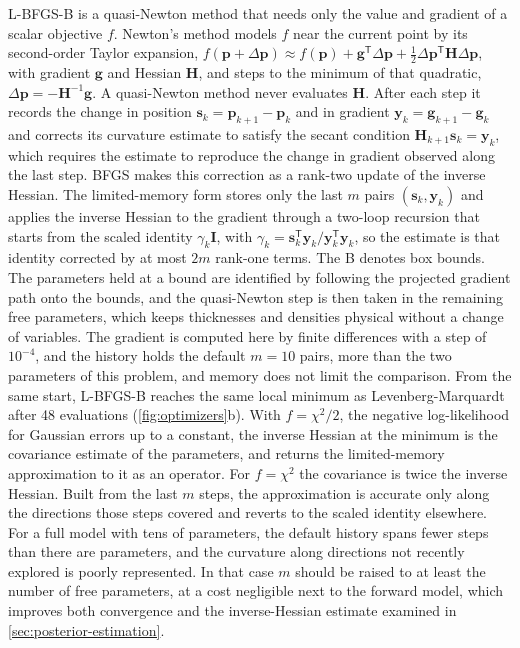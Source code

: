 L-BFGS-B is a quasi-Newton method that needs only the value and gradient of a scalar objective \(f\).\autocite{byrdLimitedMemoryAlgorithm1995} Newton's method models \(f\) near the current point by its second-order Taylor expansion, \(f(\mathbf{p} + \Delta\mathbf{p}) \approx f(\mathbf{p}) + \mathbf{g}^{\mathsf{T}}\Delta\mathbf{p} + \tfrac{1}{2}\Delta\mathbf{p}^{\mathsf{T}}\mathbf{H}\Delta\mathbf{p}\), with gradient \(\mathbf{g}\) and Hessian \(\mathbf{H}\), and steps to the minimum of that quadratic, \(\Delta\mathbf{p} = - \mathbf{H}^{- 1}\mathbf{g}\). A quasi-Newton method never evaluates \(\mathbf{H}\). After each step it records the change in position \(\mathbf{s}_{k} = \mathbf{p}_{k + 1} - \mathbf{p}_{k}\) and in gradient \(\mathbf{y}_{k} = \mathbf{g}_{k + 1} - \mathbf{g}_{k}\) and corrects its curvature estimate to satisfy the secant condition \(\mathbf{H}_{k + 1}\mathbf{s}_{k} = \mathbf{y}_{k}\), which requires the estimate to reproduce the change in gradient observed along the last step. BFGS makes this correction as a rank-two update of the inverse Hessian. The limited-memory form stores only the last \(m\) pairs \(\left( \mathbf{s}_{k},\mathbf{y}_{k} \right)\) and applies the inverse Hessian to the gradient through a two-loop recursion that starts from the scaled identity \(\gamma_{k}\mathbf{I}\), with \(\gamma_{k} = \mathbf{s}_{k}^{\mathsf{T}}\mathbf{y}_{k}/\mathbf{y}_{k}^{\mathsf{T}}\mathbf{y}_{k}\), so the estimate is that identity corrected by at most \(2m\) rank-one terms. The B denotes box bounds. The parameters held at a bound are identified by following the projected gradient path onto the bounds, and the quasi-Newton step is then taken in the remaining free parameters, which keeps thicknesses and densities physical without a change of variables. The gradient is computed here by finite differences with a step of \(10^{- 4}\), and the history holds the default \(m = 10\) pairs, more than the two parameters of this problem, and memory does not limit the comparison. From the same start, L-BFGS-B reaches the same local minimum as Levenberg-Marquardt after 48 evaluations (\cref{fig:optimizers}b). With \(f = \chi^{2}/2\), the negative log-likelihood for Gaussian errors up to a constant, the inverse Hessian at the minimum is the covariance estimate of the parameters, and  returns the limited-memory approximation to it as an operator. For \(f = \chi^{2}\) the covariance is twice the inverse Hessian. Built from the last \(m\) steps, the approximation is accurate only along the directions those steps covered and reverts to the scaled identity elsewhere. For a full model with tens of parameters, the default history spans fewer steps than there are parameters, and the curvature along directions not recently explored is poorly represented. In that case \(m\) should be raised to at least the number of free parameters, at a cost negligible next to the forward model, which improves both convergence and the inverse-Hessian estimate examined in \cref{sec:posterior-estimation}.

